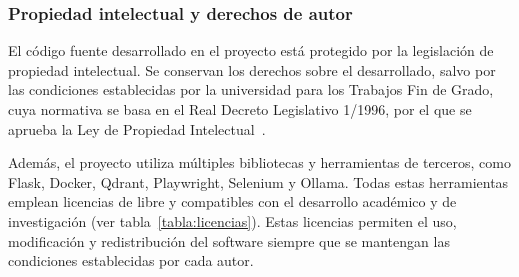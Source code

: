 \subsubsection{Propiedad intelectual y derechos de autor}\label{subsec:propiedad}

El código fuente desarrollado en el proyecto está protegido por la legislación de propiedad intelectual. Se conservan los derechos sobre el  desarrollado, salvo por las condiciones establecidas por la universidad para los Trabajos Fin de Grado, cuya normativa se basa en el Real Decreto Legislativo 1/1996, por el que se aprueba la Ley de Propiedad Intelectual~\cite{legal:propintelect}.

Además, el proyecto utiliza múltiples bibliotecas y herramientas de terceros, como Flask, Docker, Qdrant, Playwright, Selenium y Ollama. Todas estas herramientas emplean licencias de  libre y  compatibles con el desarrollo académico y de investigación (ver tabla~\ref{tabla:licencias}). Estas licencias permiten el uso, modificación y redistribución del software siempre que se mantengan las condiciones establecidas por cada autor.

